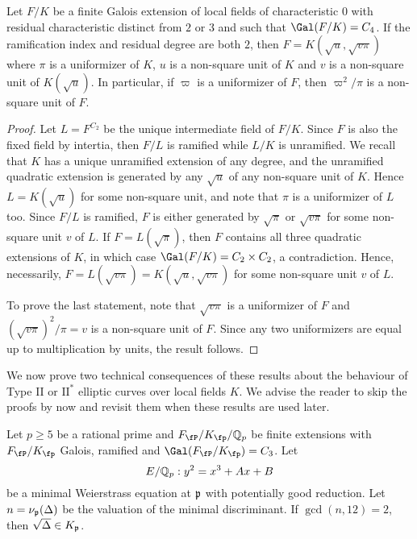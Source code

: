 \begin{lemma}\label{lem_localC4}
    Let $F/K$ be a finite Galois extension of local fields of characteristic $0$ with residual characteristic distinct from $2$ or $3$ and such that $\Gal(F/K)=C_4$. If the ramification index and residual degree are both $2$, then $F=K(\sqrt{u},\sqrt{v\pi})$ where $\pi$ is a uniformizer of $K$, $u$ is a non-square unit of $K$ and $v$ is a non-square unit of $K(\sqrt{u})$.
    In particular, if $\varpi$ is a uniformizer of $F$, then $\varpi^2/\pi$ is a non-square unit of $F$.
\end{lemma}

\begin{proof}
    Let $L=F^{C_2}$ be the unique intermediate field of $F/K$. Since $F$ is also the fixed field by intertia, then $F/L$ is ramified while $L/K$ is unramified. We recall that $K$ has a unique unramified extension of any degree, and the unramified quadratic extension is generated by any $\sqrt{u}$ of any non-square unit of $K$. Hence $L=K(\sqrt{u})$ for some non-square unit, and note that $\pi$ is a uniformizer of $L$ too. Since $F/L$ is ramified, $F$ is either generated by $\sqrt{\pi}$ or $\sqrt{v\pi}$ for some non-square unit $v$ of $L$. If $F=L(\sqrt{\pi})$, then $F$ contains all three quadratic extensions of $K$, in which case $\Gal(F/K)=C_2\times C_2$, a contradiction. Hence, necessarily, $F=L(\sqrt{v\pi})=K(\sqrt{u},\sqrt{v\pi})$ for some non-square unit $v$ of $L$.

    To prove the last statement, note that $\sqrt{v\pi}$ is a uniformizer of $F$ and $(\sqrt{v\pi})^2/\pi=v$ is a non-square unit of $F$. Since any two uniformizers are equal up to multiplication by units, the result follows. 
\end{proof}

We now prove two technical consequences of these results about the behaviour of Type II or $\mathrm{II}^*$ elliptic curves over local fields $K$. We advise the reader to skip the proofs by now and revisit them when these results are used later.

\begin{lemma}\label{lem_nottwo}
    Let $p\geq 5$ be a rational prime and $F_\fP/K_\fp/\QQ_p$ be finite extensions with $F_\fP/K_\fp$ Galois, ramified and $\Gal(F_\fP/K_\fp)=C_3$. Let $$E/\mathbb{Q}_p:y^2=x^3+Ax+B$$ be a minimal Weierstrass equation at $\mathfrak{p}$ with potentially good reduction. Let $n=\nu_{\mathfrak{p}}(\Delta)$ be the valuation of the minimal discriminant. If $\gcd(n,12)=2$, then $\sqrt{\Delta}\in K_{\mathfrak{p}}$.
\end{lemma}

